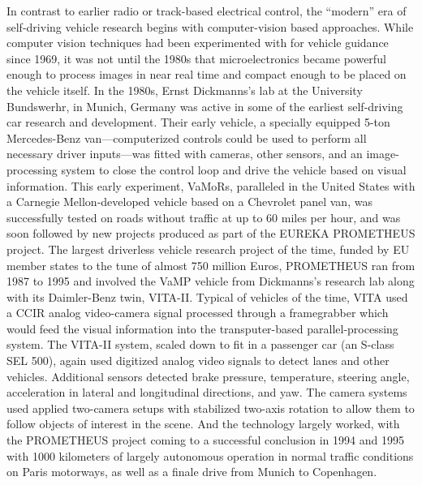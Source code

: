 In contrast to earlier radio or track-based electrical control, the
``modern'' era of self-driving vehicle research begins with
computer-vision based approaches. While computer vision techniques had
been experimented with for vehicle guidance since 1969, it was not
until the 1980s that microelectronics became powerful enough to
process images in near real time and compact enough to be placed on
the vehicle itself\cite{???}. In the 1980s, Ernst Dickmanns's lab at the
University Bundswerhr, in Munich, Germany was active in some of the
earliest self-driving car research and development\cite{???}. Their early
vehicle, a specially equipped 5-ton Mercedes-Benz van---computerized
controls could be used to perform all necessary driver inputs---was
fitted with cameras, other sensors, and an image-processing system to
close the control loop and drive the vehicle based on visual
information.\cite{???} This early experiment, VaMoRs, paralleled in the United
States with a Carnegie Mellon-developed vehicle based on a Chevrolet
panel van, was successfully tested on roads without traffic at up to
60 miles per hour,\cite{???} and was soon followed by new projects produced as
part of the EUREKA PROMETHEUS project\cite{???}. The largest driverless vehicle
research project of the time, funded by EU member states to the tune
of almost 750 million Euros, PROMETHEUS ran from 1987 to 1995 and
involved the VaMP vehicle from Dickmanns's research lab along with its
Daimler-Benz twin, VITA-II. Typical of vehicles of the time, VITA used
a CCIR analog video-camera signal processed through a framegrabber
which would feed the visual information into the transputer-based
parallel-processing system\cite{???}. The VITA-II system, scaled down to fit in
a passenger car (an S-class SEL 500), again used digitized analog
video signals to detect lanes and other vehicles\cite{???}. Additional sensors
detected brake pressure, temperature, steering angle, acceleration in
lateral and longitudinal directions, and yaw\cite{???}. The camera systems used
applied two-camera setups with stabilized two-axis rotation to allow
them to follow objects of interest in the scene\cite{???}. And the
technology largely worked, with the PROMETHEUS project coming to a
successful conclusion in 1994 and 1995 with 1000 kilometers of largely
autonomous operation in normal traffic conditions on Paris motorways,
as well as a finale drive from Munich to Copenhagen\cite{???}.

